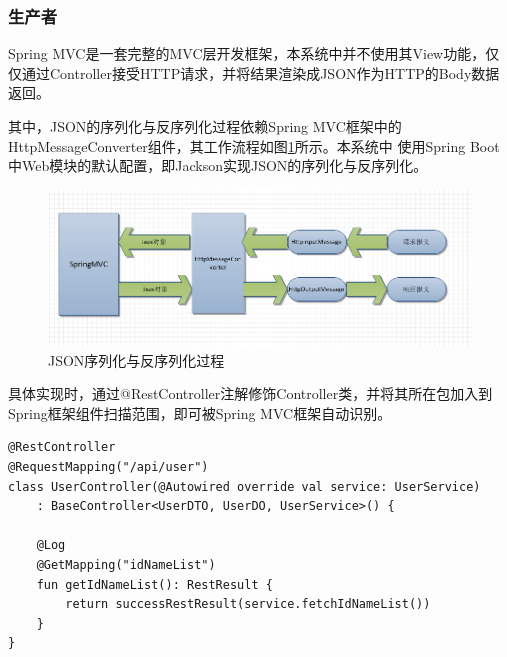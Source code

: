 \documentclass[titlepage,UTF8,linespread=1.5]{ctexart}
\begin{document}
\subsubsection{生产者}
Spring MVC是一套完整的MVC层开发框架，本系统中并不使用其View功能，仅仅通过Controller接受HTTP请求，并将结果渲染成JSON作为HTTP的Body数据返回。\par
其中，JSON的序列化与反序列化过程依赖Spring MVC框架中的HttpMessageConverter组件，其工作流程如图\ref{fig:flow-spring-mvc-rest}所示。本系统中
使用Spring Boot中Web模块的默认配置，即Jackson实现JSON的序列化与反序列化。\par
\begin{figure}[H]
    \centering
    \includegraphics[width=150mm]{flow-spring-mvc-rest.png}
    \caption{JSON序列化与反序列化过程}
    \label{fig:flow-spring-mvc-rest}
\end{figure}
具体实现时，通过@RestController注解修饰Controller类，并将其所在包加入到Spring框架组件扫描范围，即可被Spring MVC框架自动识别。\par
\begin{mdframed}\begin{verbatim}
@RestController
@RequestMapping("/api/user")
class UserController(@Autowired override val service: UserService)
    : BaseController<UserDTO, UserDO, UserService>() {

    @Log
    @GetMapping("idNameList")
    fun getIdNameList(): RestResult {
        return successRestResult(service.fetchIdNameList())
    }
}
\end{verbatim}\end{mdframed}\par
\end{document}
